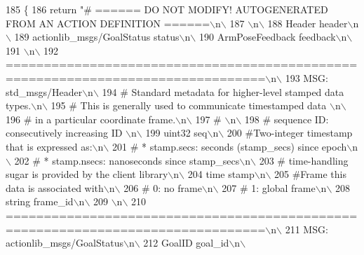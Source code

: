 \begin{DoxyCode}
185   \{
186     \textcolor{keywordflow}{return} \textcolor{stringliteral}{"# ====== DO NOT MODIFY! AUTOGENERATED FROM AN ACTION DEFINITION ======\(\backslash\)n\(\backslash\)}
187 \textcolor{stringliteral}{\(\backslash\)n\(\backslash\)}
188 \textcolor{stringliteral}{Header header\(\backslash\)n\(\backslash\)}
189 \textcolor{stringliteral}{actionlib\_msgs/GoalStatus status\(\backslash\)n\(\backslash\)}
190 \textcolor{stringliteral}{ArmPoseFeedback feedback\(\backslash\)n\(\backslash\)}
191 \textcolor{stringliteral}{\(\backslash\)n\(\backslash\)}
192 \textcolor{stringliteral}{================================================================================\(\backslash\)n\(\backslash\)}
193 \textcolor{stringliteral}{MSG: std\_msgs/Header\(\backslash\)n\(\backslash\)}
194 \textcolor{stringliteral}{# Standard metadata for higher-level stamped data types.\(\backslash\)n\(\backslash\)}
195 \textcolor{stringliteral}{# This is generally used to communicate timestamped data \(\backslash\)n\(\backslash\)}
196 \textcolor{stringliteral}{# in a particular coordinate frame.\(\backslash\)n\(\backslash\)}
197 \textcolor{stringliteral}{# \(\backslash\)n\(\backslash\)}
198 \textcolor{stringliteral}{# sequence ID: consecutively increasing ID \(\backslash\)n\(\backslash\)}
199 \textcolor{stringliteral}{uint32 seq\(\backslash\)n\(\backslash\)}
200 \textcolor{stringliteral}{#Two-integer timestamp that is expressed as:\(\backslash\)n\(\backslash\)}
201 \textcolor{stringliteral}{# * stamp.secs: seconds (stamp\_secs) since epoch\(\backslash\)n\(\backslash\)}
202 \textcolor{stringliteral}{# * stamp.nsecs: nanoseconds since stamp\_secs\(\backslash\)n\(\backslash\)}
203 \textcolor{stringliteral}{# time-handling sugar is provided by the client library\(\backslash\)n\(\backslash\)}
204 \textcolor{stringliteral}{time stamp\(\backslash\)n\(\backslash\)}
205 \textcolor{stringliteral}{#Frame this data is associated with\(\backslash\)n\(\backslash\)}
206 \textcolor{stringliteral}{# 0: no frame\(\backslash\)n\(\backslash\)}
207 \textcolor{stringliteral}{# 1: global frame\(\backslash\)n\(\backslash\)}
208 \textcolor{stringliteral}{string frame\_id\(\backslash\)n\(\backslash\)}
209 \textcolor{stringliteral}{\(\backslash\)n\(\backslash\)}
210 \textcolor{stringliteral}{================================================================================\(\backslash\)n\(\backslash\)}
211 \textcolor{stringliteral}{MSG: actionlib\_msgs/GoalStatus\(\backslash\)n\(\backslash\)}
212 \textcolor{stringliteral}{GoalID goal\_id\(\backslash\)n\(\backslash\)}

\end{DoxyCode}

